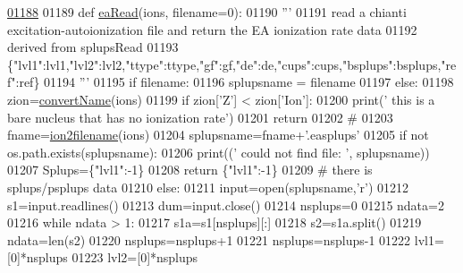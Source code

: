 \begin{DoxyCode}
\hypertarget{namespacepyneb_1_1utils_1_1__chianti__tools_l01188}{}\hyperlink{namespacepyneb_1_1utils_1_1__chianti__tools_ab4f78a2584a1ddf189af644e961f0f83}{01188} 
01189 \textcolor{keyword}{def }\hyperlink{namespacepyneb_1_1utils_1_1__chianti__tools_ab4f78a2584a1ddf189af644e961f0f83}{eaRead}(ions, filename=0):
01190     \textcolor{stringliteral}{'''}
01191 \textcolor{stringliteral}{    read a chianti excitation-autoionization file and return the EA ionization rate data}
01192 \textcolor{stringliteral}{    derived from splupsRead}
01193 \textcolor{stringliteral}{    \{"lvl1":lvl1,"lvl2":lvl2,"ttype":ttype,"gf":gf,"de":de,"cups":cups,"bsplups":bsplups,"ref":ref\}}
01194 \textcolor{stringliteral}{    '''}
01195     \textcolor{keywordflow}{if} filename:
01196         splupsname = filename
01197     \textcolor{keywordflow}{else}:
01198         zion=\hyperlink{namespacepyneb_1_1utils_1_1__chianti__tools_a8038874902563556b0a8b536f52d3194}{convertName}(ions)
01199         \textcolor{keywordflow}{if} zion[\textcolor{stringliteral}{'Z'}] < zion[\textcolor{stringliteral}{'Ion'}]:
01200             print(\textcolor{stringliteral}{' this is a bare nucleus that has no ionization rate'})
01201             \textcolor{keywordflow}{return}
01202         \textcolor{comment}{#}
01203         fname=\hyperlink{namespacepyneb_1_1utils_1_1__chianti__tools_a7748521ca99103785680d691667ce851}{ion2filename}(ions)
01204         splupsname=fname+\textcolor{stringliteral}{'.easplups'}
01205     \textcolor{keywordflow}{if} \textcolor{keywordflow}{not} os.path.exists(splupsname):
01206         print((\textcolor{stringliteral}{' could not find file:  '}, splupsname))
01207         Splups=\{\textcolor{stringliteral}{"lvl1"}:-1\}
01208         \textcolor{keywordflow}{return} \{\textcolor{stringliteral}{"lvl1"}:-1\}
01209     \textcolor{comment}{# there is splups/psplups data}
01210     \textcolor{keywordflow}{else}:
01211         input=open(splupsname,\textcolor{stringliteral}{'}\textcolor{stringliteral}{r')}
01212 \textcolor{stringliteral}{        s1=input.readlines()}
01213 \textcolor{stringliteral}{        dum=input.close()}
01214 \textcolor{stringliteral}{        nsplups=0}
01215 \textcolor{stringliteral}{        ndata=2}
01216 \textcolor{stringliteral}{        }\textcolor{keywordflow}{while} ndata > 1:
01217             s1a=s1[nsplups][:]
01218             s2=s1a.split()
01219             ndata=len(s2)
01220             nsplups=nsplups+1
01221         nsplups=nsplups-1
01222         lvl1=[0]*nsplups
01223         lvl2=[0]*nsplups

\end{DoxyCode}
